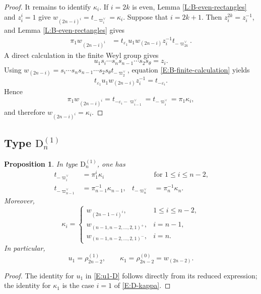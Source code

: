 \documentclass[a4paper]{amsart}
\newtheorem{prop}[thm]{Proposition}
\theoremstyle{remark}
\numberwithin{equation}{section}
\begin{document}
{\begin{proof}
It remains to identify $\kappa_i$.  If $i=2k$ is even, Lemma
\ref{L:B-even-rectangles} and $z_i^i=1$ give
$w_{(2n-i)^i}=t_{-\varpi_i^\lor}=\kappa_i$.
Suppose that $i=2k+1$.  Then $z_i^{2k}=z_i^{-1}$, and Lemma
\ref{L:B-even-rectangles} gives
\begin{align*}
  \pi_1w_{(2n-i)^i}
  &=t_{\varepsilon_1}u_1w_{(2n-i)}z_i^{-1}
    t_{-\varpi_{2k}^\lor}.
\end{align*}
A direct calculation in the finite Weyl group gives
\begin{equation}
\label{E:B-finite-calculation}
  u_1s_i\dotsm s_ns_{n-1}\dotsm s_2s_\theta=z_i.
\end{equation}
Using
$w_{(2n-i)}=s_i\dotsm s_ns_{n-1}\dotsm s_2s_\theta
t_{-\varpi_2^\lor}$, equation \eqref{E:B-finite-calculation} yields
\[
  t_{\varepsilon_1}u_1w_{(2n-i)}z_i^{-1}=t_{-\varepsilon_i}.
\]
Hence
\[
  \pi_1w_{(2n-i)^i}
   =t_{-\varepsilon_i-\varpi_{i-1}^\lor}
   =t_{-\varpi_i^\lor}
   =\pi_1\kappa_i,
\]
and therefore $w_{(2n-i)^i}=\kappa_i$.
\end{proof}

\subsection{Type $\mathrm{D}_n^{(1)}$}

\begin{prop}
\label{P:D-kappa}
In type $\mathrm{D}_n^{(1)}$, one has
\begin{align}
\label{E:D-antidominant-nonspin}
  t_{-\varpi_i^\lor}&=\pi_1^i\kappa_i
  &&\text{for $1\leq i\leq n-2$,}
  \\
\label{E:D-antidominant-spin}
  t_{-\varpi_{n-1}^\lor}&=\pi_{n-1}^{-1}\kappa_{n-1},
  &
  t_{-\varpi_n^\lor}&=\pi_n^{-1}\kappa_n.
\end{align}
Moreover,
\begin{equation}
\label{E:D-kappa}
  \kappa_i=
  \begin{cases}
    w_{(2n-1-i)^i},&1\leq i\leq n-2,\\
    w_{(n-1,n-2,\ldots,2,1)^+},&i=n-1,\\
    w_{(n-1,n-2,\ldots,2,1)^-},&i=n.
  \end{cases}
\end{equation}
In particular,
\begin{equation}
\label{E:u1-D}
  u_1=\rho_{2n-2}^{(1)},
  \qquad
  \kappa_1=\rho_{2n-2}^{(0)}=w_{(2n-2)}.
\end{equation}
\end{prop}
\begin{proof}
The identity for $u_1$ in \eqref{E:u1-D} follows directly from its reduced
expression; the identity for $\kappa_1$ is the case $i=1$ of
\eqref{E:D-kappa}.


\end{proof}}
\end{document}
